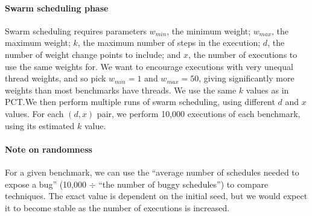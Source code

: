 \paragraph{Swarm scheduling phase}
Swarm scheduling requires parameters $w_{min}$, the minimum weight; $w_{max}$,
the maximum weight; $k$, the maximum number of steps in the execution; $d$, the
number of weight change points to include; and $x$, the number of executions to
use the same weights for.  We want to encourage executions with very unequal
thread weights, and so pick $w_{min}=1$ and $w_{max}=50$, giving significantly
more weights than most benchmarks have threads.  We use the same $k$ values as
in PCT.\@ We then perform multiple runs of swarm scheduling, using different $d$
and $x$ values.  For each $(d, x)$ pair, we perform 10,000 executions of each
benchmark, using its estimated $k$ value.

\paragraph{Note on randomness}
For a given benchmark, we can use the ``average number of schedules needed to
expose a bug'' (10,000 $\div$ ``the number of buggy schedules'') to compare
techniques.  The exact value is dependent on the initial seed, but we would
expect it to become stable as the number of executions is
increased\cite{thomson2016}.

